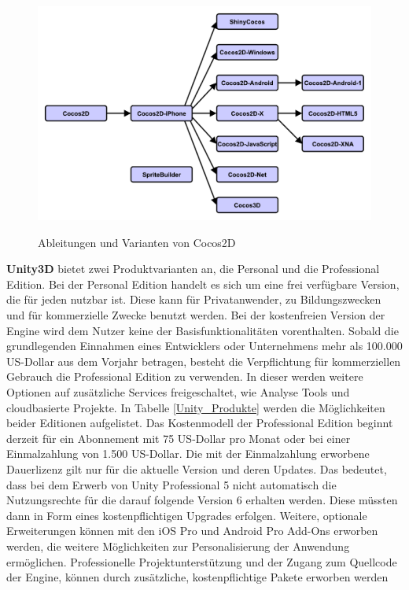 \begin{figure}[htbp]
	\centering
	\includegraphics[width=1\textwidth]{Bilder/Cocos2d_Relationships}
	\caption{Ableitungen und Varianten von Cocos2D}\label{graph_Cocos2d_Relationships}\citep{cocos2d_relationships}
\end{figure}

\bigskip
\textbf{Unity3D} bietet zwei Produktvarianten an, die Personal und die Professional Edition. Bei der Personal Edition handelt es sich um eine frei verfügbare Version, die für jeden nutzbar ist. Diese kann für Privatanwender, zu Bildungszwecken und für kommerzielle Zwecke benutzt werden. Bei der kostenfreien Version der Engine wird dem Nutzer keine der Basisfunktionalitäten vorenthalten. Sobald die grundlegenden Einnahmen eines Entwicklers oder Unternehmens mehr als 100.000 US-Dollar aus dem Vorjahr betragen, besteht die Verpflichtung für kommerziellen Gebrauch die Professional Edition zu verwenden. In dieser werden weitere Optionen auf zusätzliche Services freigeschaltet, wie Analyse Tools und cloudbasierte Projekte. In Tabelle \ref{Unity_Produkte} werden die Möglichkeiten beider Editionen aufgelistet. Das Kostenmodell der Professional Edition beginnt derzeit für ein Abonnement mit 75 US-Dollar pro Monat oder bei einer Einmalzahlung von 1.500 US-Dollar. Die mit der Einmalzahlung erworbene Dauerlizenz gilt nur für die aktuelle Version und deren Updates. Das bedeutet, dass bei dem Erwerb von Unity Professional 5 nicht automatisch die Nutzungsrechte für die darauf folgende Version 6 erhalten werden. Diese müssten dann in Form eines kostenpflichtigen Upgrades erfolgen. Weitere, optionale Erweiterungen können mit den iOS Pro und Android Pro Add-Ons erworben werden, die weitere Möglichkeiten zur Personalisierung der Anwendung ermöglichen. Professionelle Projektunterstützung und der Zugang zum Quellcode der Engine, können durch zusätzliche, kostenpflichtige Pakete erworben werden \citep{unity_products}

